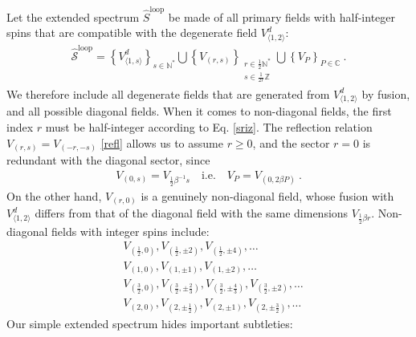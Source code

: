 \documentclass[12pt, a4paper]{article}
\theoremstyle{break}
\begin{document}
Let the extended spectrum $\widehat{S}^\text{loop}$ be made of all primary fields with half-integer spins that are compatible with the degenerate field $V^d_{\langle 1,2\rangle}$:
\begin{align}
 \boxed{\widehat{\mathcal{S}}^\text{loop} = \left\{V^d_{\langle 1,s\rangle}\right\}_{s\in\mathbb{N}^*}  \bigcup \left\{V_{(r,s)}\right\}_{\substack{r\in \frac12\mathbb{N}^*\\ s\in\frac{1}{2r}\mathbb{Z}}}\bigcup \left\{ V_P\right\}_{P\in\mathbb{C}} } \ .
 \label{sloop}
\end{align}
We therefore include all degenerate fields that are generated from $V^d_{\langle 1,2\rangle}$ by fusion, and all possible diagonal fields. When it comes to non-diagonal fields, the first index $r$ must be half-integer according to Eq. \eqref{sriz}. The reflection relation $V_{(r,s)}=V_{(-r,-s)}$ \eqref{refl} allows us to assume $r\geq 0$, and the sector $r=0$ is redundant with the diagonal sector, since 
\begin{align}
 V_{(0,s)} = V_{\frac12\beta^{-1}s}  \quad \text{i.e.} \quad V_P = V_{(0,2\beta P)} \ .
 \label{sP}
\end{align}
On the other hand, $V_{(r,0)}$ is a genuinely non-diagonal field, whose fusion with $V^d_{\langle 1,2\rangle}$ differs from that of the diagonal field with the same dimensions $V_{\frac12\beta r}$. 
Non-diagonal fields with integer spins include:
\begin{subequations}
\label{vex}
\begin{align}
 & V_{(\frac12, 0)}, V_{(\frac12,\pm 2)}, V_{(\frac12, \pm 4)}, \dots
 \\
 & V_{(1,0)}, V_{(1,\pm 1)}, V_{(1,\pm 2)}, \dots 
 \\
 & V_{(\frac32, 0)}, V_{(\frac32, \pm\frac23)}, V_{(\frac32,\pm \frac43)} , V_{(\frac32,\pm 2)}, \dots 
 \\
 & V_{(2, 0)}, V_{(2,\pm\frac12)}, V_{(2,\pm 1)}, V_{(2,\pm\frac32)}, \dots 
\end{align}
\end{subequations}
Our simple extended spectrum hides important subtleties: 
\end{document}
